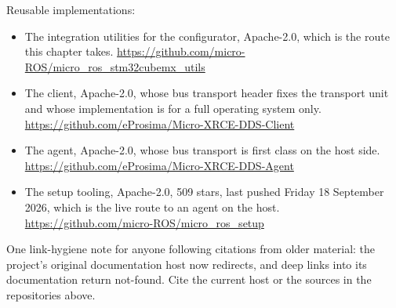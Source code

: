 Reusable implementations:
\begin{itemize}
\item The integration utilities for the configurator, Apache-2.0, which is the
route this chapter takes.\newline
\url{https://github.com/micro-ROS/micro_ros_stm32cubemx_utils}
\item The client, Apache-2.0, whose bus transport header fixes the transport unit
and whose implementation is for a full operating system only.\newline
\url{https://github.com/eProsima/Micro-XRCE-DDS-Client}
\item The agent, Apache-2.0, whose bus transport is first class on the host
side.\newline
\url{https://github.com/eProsima/Micro-XRCE-DDS-Agent}
\item The setup tooling, Apache-2.0, 509 stars, last pushed Friday 18 September
2026, which is the live route to an agent on the host.\newline
\url{https://github.com/micro-ROS/micro_ros_setup}
\end{itemize}

One link-hygiene note for anyone following citations from older material: the
project's original documentation host now redirects, and deep links into its
documentation return not-found. Cite the current host or the sources in the
repositories above.
